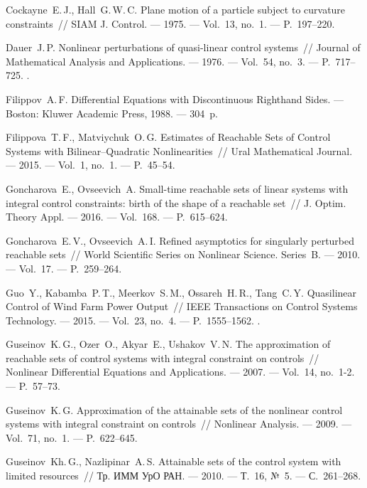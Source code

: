 \documentclass[../main.tex]{subfiles}
\begin{document}
\begin{thebibliography}{99}
Cockayne~E.\,J., Hall~G.\,W.\,C. Plane motion of a particle subject to curvature constraints~// SIAM J. Control. --- 1975. --- Vol.~13, no.~1. --- P.~197--220. 

Dauer~J.\,P. Nonlinear perturbations of quasi-linear control systems~// Journal of Mathematical Analysis and Applications. --- 1976. --- Vol.~54, no.~3. --- P.~717--725. 
.

Filippov~A.\,F. Differential Equations with Discontinuous Righthand Sides. --- Boston: Kluwer Academic Press, 1988. --- 304~p.

Filippova~T.\,F., Matviychuk~O.\,G. Estimates of Reachable Sets of Control Systems with Bilinear--Quadratic Nonlinearities~// Ural Mathematical Journal. --- 2015. --- Vol.~1, no.~1. --- P.~45--54. 
 
Goncharova~E., Ovseevich~A. Small-time reachable sets of linear systems with integral control constraints: birth of the shape of a reachable set~// J. Optim. Theory Appl. --- 2016. --- Vol.~168. --- P.~615--624.
 
Goncharova~E.\,V., Ovseevich~A.\,I. Refined asymptotics for singularly perturbed reachable sets~// World Scientific Series on Nonlinear Science. Series~B. --- 2010. --- Vol.~17. --- P.~259--264.

Guo~Y., Kabamba~P.\,T., Meerkov~S.\,M., Ossareh~H.\,R., Tang~C.\,Y. Quasilinear Control of Wind Farm Power Output~// IEEE Transactions on Control Systems Technology. --- 2015. --- Vol.~23, no.~4. --- P.~1555--1562.
.

Guseinov~K.\,G., Ozer~O., Akyar~E., Ushakov~V.\,N. The approximation of reachable sets of control systems with integral constraint on controls~// Nonlinear Differential Equations and Applications. --- 2007. --- Vol.~14, no.~1-2. --- P.~57--73.

Guseinov~K.\,G. Approximation of the attainable sets of the nonlinear control systems with integral constraint on controls~// Nonlinear Analysis. --- 2009. --- Vol.~71, no.~1. --- P.~622--645. 

Guseinov~Kh.\,G., Nazlipinar~A.\,S. Attainable sets of the control system with limited resources~// Тр. ИММ УрО РАН. --- 2010. --- Т.~16, №~5. --- С.~261--268.


\end{thebibliography}
\end{document}
